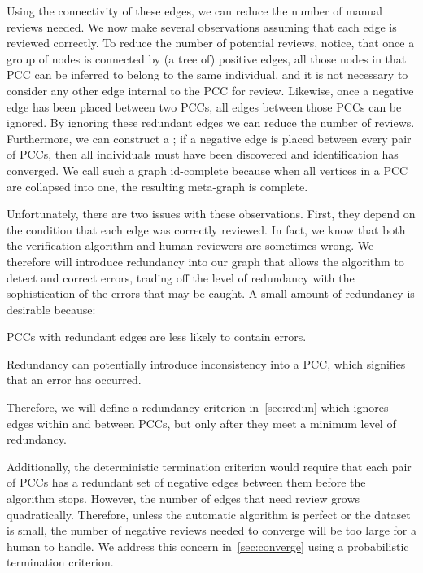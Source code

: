 Using the connectivity of these edges, we can reduce the number of manual reviews needed.
We now make several observations assuming that each edge is reviewed correctly.
To reduce the number of potential reviews, notice, that once a group of nodes is connected by (a tree of)
  positive edges, all those nodes in that PCC can be inferred to belong to the same individual, and it is not
  necessary to consider any other edge internal to the PCC for review.
Likewise, once a negative edge has been placed between two PCCs, all edges between those PCCs can be ignored.
By ignoring these redundant edges we can reduce the number of reviews.
Furthermore, we can construct a ; if a negative edge is placed
  between every pair of PCCs, then all individuals must have been discovered and identification has converged.
We call such a graph id-complete because when all vertices in a PCC are collapsed into one, the resulting
  meta-graph is complete.

Unfortunately, there are two issues with these observations.
First, they depend on the condition that each edge was correctly reviewed.
In fact, we know that both the verification algorithm and human reviewers are sometimes wrong.
We therefore will introduce redundancy into our graph that allows the algorithm to detect and correct errors,
  trading off the level of redundancy with the sophistication of the errors that may be caught.
A small amount of redundancy is desirable because:
\begin{itemln}
    \item PCCs with redundant edges are less likely to contain errors.
    \item Redundancy can potentially introduce inconsistency into a PCC, which signifies that an error has
      occurred.
\end{itemln}
Therefore, we will define a redundancy criterion in~\cref{sec:redun} which ignores edges within and between PCCs,
  but only after they meet a minimum level of redundancy.

Additionally, the deterministic termination criterion would require that each pair of PCCs has a redundant set of
  negative edges between them before the algorithm stops.
However, the number of edges that need review grows quadratically.
Therefore, unless the automatic algorithm is perfect or the dataset is small, the number of negative reviews
  needed to converge will be too large for a human to handle.
We address this concern in~\cref{sec:converge} using a probabilistic termination criterion.

